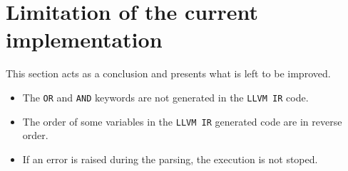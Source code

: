 \documentclass[a4paper,11pt]{article}
\begin{document}
\section{Limitation of the current implementation}
This section acts as a conclusion and presents what is left to be improved.

\begin{itemize}
	\item The \texttt{OR} and \texttt{AND} keywords are not generated in
		the \texttt{LLVM IR} code.
	\item The order of some variables in the \texttt{LLVM IR} generated
		code are in reverse order.
	\item If an error is raised during the parsing, the execution is not
		stoped.
\end{itemize}
\end{document}

